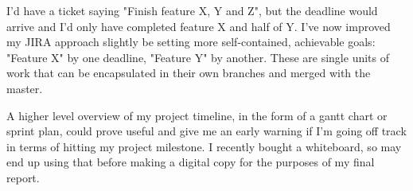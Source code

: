 I'd have a ticket saying "Finish feature X, Y and Z", but the deadline would arrive and I'd only have completed feature X and half of Y. I've now improved my JIRA approach slightly be setting more self-contained, achievable goals: "Feature X" by one deadline, "Feature Y" by another. These are single units of work that can be encapsulated in their own branches and merged with the master.

A higher level overview of my project timeline, in the form of a gantt chart or sprint plan, could prove useful and give me an early warning if I'm going off track in terms of hitting my project milestone. I recently bought a whiteboard, so may end up using that before making a digital copy for the purposes of my final report.